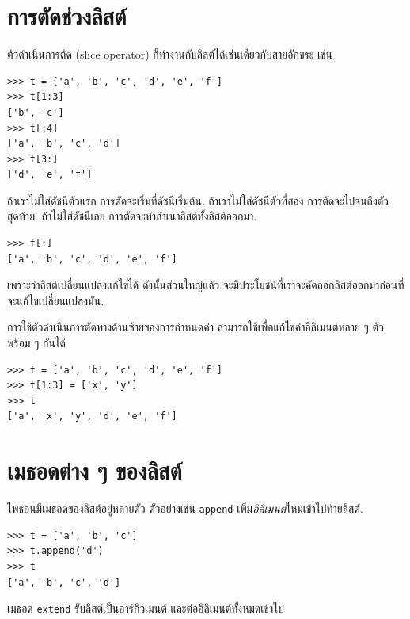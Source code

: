 \section{การตัดช่วงลิสต์}


ตัวดำเนินการตัด (slice operator) ก็ทำงานกับลิสต์ได้เช่นเดียวกับสายอักขระ เช่น

\begin{verbatim}
>>> t = ['a', 'b', 'c', 'd', 'e', 'f']
>>> t[1:3]
['b', 'c']
>>> t[:4]
['a', 'b', 'c', 'd']
>>> t[3:]
['d', 'e', 'f']
\end{verbatim}
%
ถ้าเราไม่ใส่ดัชนีตัวแรก การตัดจะเริ่มที่ดัชนีเริ่มต้น.
ถ้าเราไม่ใส่ดัชนีตัวที่สอง การตัดจะไปจนถึงตัวสุดท้าย.
ถ้าไม่ใส่ดัชนีเลย การตัดจะทำสำเนาลิสต์ทั้งลิสต์ออกมา.


\begin{verbatim}
>>> t[:]
['a', 'b', 'c', 'd', 'e', 'f']
\end{verbatim}
%
เพราะว่าลิสต์เปลี่ยนแปลงแก้ไขได้
ดังนั้นส่วนใหญ่แล้ว จะมีประโยชน์ที่เราจะคัดลอกลิสต์ออกมาก่อนที่จะแก้ไขเปลี่ยนแปลงมัน.

การใช้ตัวดำเนินการตัดทางด้านซ้ายของการกำหนดค่า
สามารถใช้เพื่อแก้ไขค่าอิลิเมนต์หลาย ๆ ตัวพร้อม ๆ กันได้

\begin{verbatim}
>>> t = ['a', 'b', 'c', 'd', 'e', 'f']
>>> t[1:3] = ['x', 'y']
>>> t
['a', 'x', 'y', 'd', 'e', 'f']
\end{verbatim}
%

\section{เมธอดต่าง ๆ ของลิสต์}

ไพธอนมีเมธอดของลิสต์อยู่หลายตัว
ตัวอย่างเช่น 
\texttt{append} เพิ่ม\textit{อิลิเมนต์}ใหม่เข้าไปท้ายลิสต์.

\begin{verbatim}
>>> t = ['a', 'b', 'c']
>>> t.append('d')
>>> t
['a', 'b', 'c', 'd']
\end{verbatim}
%
เมธอด \texttt{extend} รับลิสต์เป็นอาร์กิวเมนต์
และต่ออิลิเมนต์ทั้งหมดเข้าไป

